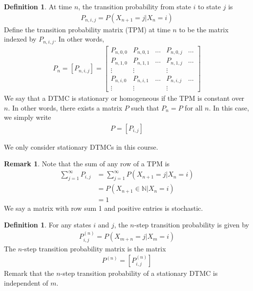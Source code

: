 \documentclass[11pt]{amsart}
\theoremstyle{definition}
\newtheorem{definition}[theorem]{Definition}
\newtheorem{remark}[theorem]{Remark}
\numberwithin{equation}{section}
\begin{document}
 \begin{definition}
     At time $n$, the transition probability from state $i$ to state $j$ is
     \begin{align*}
         P_{n,i,j}=P(X_{n+1}=j|X_n=i)
     \end{align*}
     Define the transition probability matrix (TPM) at time $n$ to be the matrix indexed by $P_{n,i,j}$. In other words,
     \begin{align*}
         P_n=[P_{n,i,j}]=\begin{bmatrix}
             P_{n,0,0} & P_{n,0,1} & \ldots & P_{n,0,j} & \ldots\\
             P_{n,1,0} & P_{n,1,1} & \ldots & P_{n,1,j} & \ldots\\
             \vdots & \vdots & & \vdots \\
             P_{n,i,0} & P_{n,i,1} & \ldots & P_{n,i,j} & \ldots \\
             \vdots & \vdots & & \vdots
         \end{bmatrix}
     \end{align*}
     We say that a DTMC is stationary or homogeneous if the TPM is constant over $n$. In other words, there exists a matrix $P$ such that $P_n=P$ for all $n$. In this case, we simply write
     \begin{align*}
         P=[P_{i,j}]
     \end{align*}

     We only consider stationary DTMCs in this course. 
 \end{definition}
 \begin{remark}
     Note that the sum of any row of a TPM is
     \begin{align*}
         \sum_{j=1}^\infty P_{i,j}&=\sum_{j=1}^\infty P(X_{n+1}=j|X_n=i)\\
         &=P(X_{n+1}\in\mathbb N|X_n=i)\\
         &=1
     \end{align*}
     We say a matrix with row sum 1 and positive entries is stochastic.
 \end{remark}
 \begin{definition}
     For any states $i$ and $j$, the $n$-step transition probability is given by
     \begin{align*}
         P^{(n)}_{i,j}=P(X_{m+n}=j|X_m=i)
     \end{align*}
     The $n$-step transition probability matrix is the matrix
     \begin{align*}
         P^{(n)}=[P^{(n)}_{i,j}]
     \end{align*}
     Remark that the $n$-step transition probability of a stationary DTMC is independent of $m$.
 \end{definition}
\end{document}
